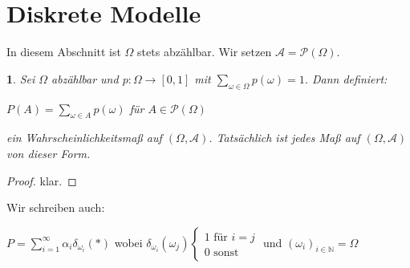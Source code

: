 \documentclass[10pt,a4paper]{report}
\numberwithin{equation}{section}
\numberwithin{figure}{section}
\theoremstyle{plain}
\theoremstyle{definition}
\theoremstyle{remark}
\theoremstyle{plain}
\newtheorem{prop}[thm]{\protect\propositionname}
\providecommand{\propositionname}{Satz}
\newcommand{\1}{ \mathbb{1} } %
\begin{document}
\section{Diskrete Modelle}
\label{sec:diskrete-modelle}

In diesem Abschnitt ist $\Omega$ stets abzählbar. Wir setzen $\mathcal{A}=\mathcal{P}(\Omega)$.
\begin{prop}
  Sei $\Omega$ abzählbar und $p: \Omega \to [0,1]$ mit
  $\sum\limits_{\omega \in \Omega}p(\omega)=1$. Dann definiert:
  \begin{center}
    $P(A)=\sum\limits_{\omega \in A} p(\omega)$ für $A\in
    \mathcal{P}(\Omega)$
  \end{center}
  ein Wahrscheinlichkeitsmaß auf $(\Omega,\mathcal{A})$. Tatsächlich ist jedes Maß auf
  $(\Omega,\mathcal{A})$ von dieser Form.
\end{prop}
  \begin{proof}
    klar.
  \end{proof}
Wir schreiben auch:
  \begin{center}
    $P=\sum\limits_{i=1}^\infty \alpha_i\delta_{\omega_i}(*)$ wobei
    $\delta_{\omega_i}(\omega_j)
    \begin{cases}
      1 \text{ für } i=j\\
      0 \text{ sonst}
    \end{cases}$ und $(\omega_i)_{i \in \mathbb{N}}=\Omega$
  \end{center}
\end{document}
